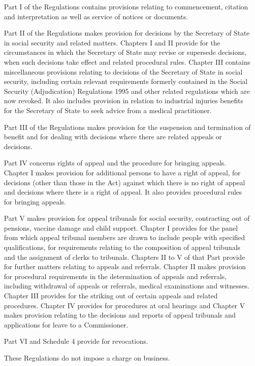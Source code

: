 \documentclass[12pt,a4paper]{article}
\begin{document}
  Part I of the Regulations contains provisions relating to commencement, citation and interpretation as well as service of notices or documents.

  Part II of the Regulations makes provision for decisions by the Secretary of State in social security and related matters. Chapters I and II provide for the circumstances in which the Secretary of State may revise or supersede decisions, when such decisions take effect and related procedural rules. Chapter III contains miscellaneous provisions relating to decisions of the Secretary of State in social security, including certain relevant requirements formerly contained in the Social Security (Adjudication) Regulations 1995 and other related regulations which are now revoked. It also includes provision in relation to industrial injuries benefits for the Secretary of State to seek advice from a medical practitioner.

  Part III of the Regulations makes provision for the suspension and termination of benefit and for dealing with decisions where there are related appeals or decisions.

  Part IV concerns rights of appeal and the procedure for bringing appeals. Chapter I makes provision for additional persons to have a right of appeal, for decisions (other than those in the Act) against which there is no right of appeal and decisions where there is a right of appeal. It also provides procedural rules for bringing appeals.

  Part V makes provision for appeal tribunals for social security, contracting out of pensions, vaccine damage and child support. Chapter I provides for the panel from which appeal tribunal members are drawn to include people with specified qualifications, for requirements relating to the composition of appeal tribunals and the assignment of clerks to tribunals. Chapters II to V of that Part provide for further matters relating to appeals and referrals. Chapter II makes provision for procedural requirements in the determination of appeals and referrals, including withdrawal of appeals or referrals, medical examinations and witnesses. Chapter III provides for the striking out of certain appeals and related procedures. Chapter IV provides for procedures at oral hearings and Chapter V makes provision relating to the decisions and reports of appeal tribunals and applications for leave to a Commissioner.

  Part VI and Schedule 4 provide for revocations.

  These Regulations do not impose a charge on business.
\end{document}
